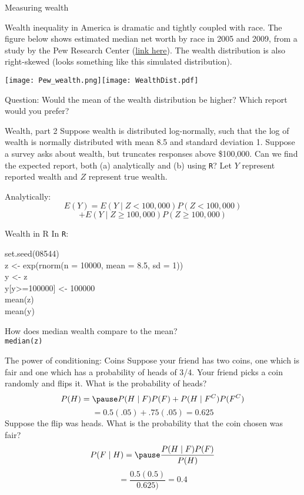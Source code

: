\documentclass{beamer}
\newenvironment{alltt}{\ttfamily}{\par}
\begin{document}
\begin{frame}{Measuring wealth}
\begin{footnotesize}Wealth inequality in America is dramatic and tightly coupled with race. The figure below shows estimated median net worth by race in 2005 and 2009, from a study by the Pew Research Center (\href{<http://citeseerx.ist.psu.edu/viewdoc/download?doi=10.1.1.397.5775&rep=rep1&type=pdf>}{link here}). The wealth distribution is also right-skewed (looks something like this simulated distribution).\end{footnotesize}
\newline
\newline
\texttt{[image: Pew\_wealth.png]}\texttt{[image: WealthDist.pdf]}

\alert{Question:} Would the mean of the wealth distribution be higher? Which report would you prefer?

\end{frame}

\begin{frame}{Wealth, part 2}
Suppose wealth is distributed log-normally, such that the log of wealth is normally distributed with mean 8.5 and standard deviation 1. Suppose a survey asks about wealth, but truncates responses above \$100,000. Can we find the expected report, both (a) analytically and (b) using \texttt{R}? Let $Y$ represent reported wealth and $Z$ represent true wealth.

Analytically: \pause
$$E(Y)=E(Y\mid Z<100,000)P(Z<100,000)$$
$$+E(Y\mid Z\geq 100,000)P(Z\geq 100,000)$$
\end{frame}

\begin{frame}{Wealth in R}
In \texttt{R}: \pause

\begin{alltt}
set.seed(08544) \\
z <- exp(rnorm(n = 10000, mean = 8.5, sd = 1)) \\
y <- z \\
y[y>=100000] <- 100000 \\
mean(z) \\
mean(y) \\
\end{alltt}

How does median wealth compare to the mean? \\
\texttt{median(z)}
\end{frame}

\begin{frame}{The power of conditioning: Coins}
Suppose your friend has two coins, one which is fair and one which has a probability of heads of 3/4. Your friend picks a coin randomly and flips it. What is the probability of heads?
\pause
$$P(H)=\pause P(H\mid F)P(F)+P(H\mid F^C)P(F^C)$$
\pause
$$=0.5(.05)+.75(.05)=0.625$$
\pause
Suppose the flip was heads. What is the probability that the coin chosen was fair?
$$P(F\mid H)=\pause\frac{P(H\mid F)P(F)}{P(H)}$$
\pause
$$=\frac{0.5(0.5)}{0.625)}=0.4$$
\end{frame}
\end{document}
